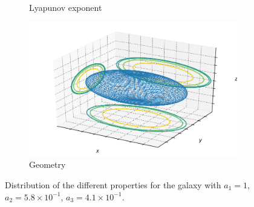\begin{figure}[h]
\begin{subfigure}[t]{0.4\textwidth}
        \caption{Lyapunov exponent}
    \end{subfigure}
    \begin{subfigure}[t]{0.4\textwidth}
        \includegraphics[width=\textwidth]{"../Files/Week 13/images/7_ellipsoid"}
        \caption{Geometry}
    \end{subfigure}
    \caption{Distribution of the different properties for the galaxy with $a_1 = 1$, $a_2 = 5.8\times10^{-1}$, $a_3 = 4.1\times10^{-1}$.}
    \label{fig: g12}
\end{figure}



